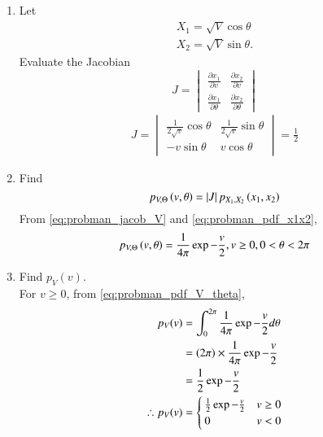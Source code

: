\begin{enumerate}[label=\thesubsection.\arabic*.,ref=\thesubsection.\theenumi]
%
\item
Let 
\begin{align}
 X_1 = \sqrt{V}\cos \theta
\\
 X_2 = \sqrt{V} \sin \theta.
\end{align}
Evaluate the Jacobian 
%
\begin{equation}
J =
\begin{vmatrix}
\frac{\partial x_1}{\partial v} & \frac{\partial x_2}{\partial v} \\
\frac{\partial x_1}{\partial \theta} & \frac{\partial x_2}{\partial \theta} 
\end{vmatrix}
\end{equation}
%
\solution
\begin{align}
J=\begin{vmatrix}
     \frac{1}{2\sqrt{v}}\cos\theta & \frac{1}{2\sqrt{v}}\sin\theta\\
       -v\sin\theta & v\cos\theta
\end{vmatrix}=\frac{1}{2}
\label{eq:probman_jacob_V}
\end{align}
\item
Find
%
\begin{equation}
p_{V,\Theta}\left(v,\theta\right) = \left\vert J\right\vert p_{X_1,X_2}\left(x_1,x_2\right)
\end{equation}
%
\solution From \eqref{eq:probman_jacob_V} and \eqref{eq:probman_pdf_x1x2},
\begin{align}
p_{V,\Theta}\left(v,\theta\right)=\frac{1}{4\pi}\exp{-\frac{v}{2}}, v \ge 0, 0 < \theta < 2\pi
\label{eq:probman_pdf_V_theta}
\end{align}
%
\item
Find $p_{V}(v)$.
\\
\solution For $v \ge 0$, from \eqref{eq:probman_pdf_V_theta},
\begin{align}
p_{V}(v) &= \int_{0}^{2\pi} \frac{1}{4\pi}\exp{-\frac{v}{2}} d \theta \\
&= \left(2\pi\right) \times \frac{1}{4\pi}\exp{-\frac{v}{2}} \\
&= \frac{1}{2}\exp{-\frac{v}{2}}\\
\therefore p_{V}(v) &= 
\begin{cases}
\frac{1}{2}\exp{-\frac{v}{2}} & v\geq 0 \\
0 & v< 0
\end{cases}
\label{eq:probman_pdf_V}
\end{align}
%


\end{enumerate}
